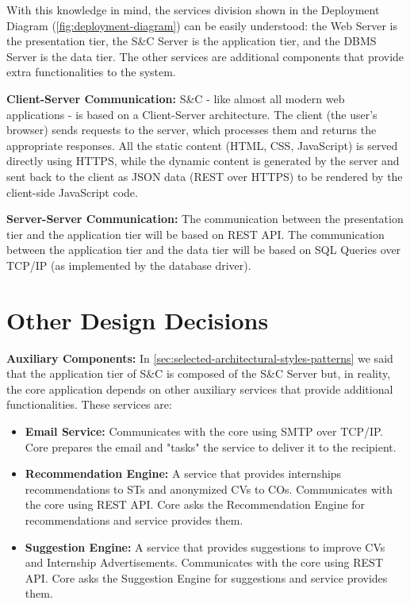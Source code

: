 With this knowledge in mind, the services division shown in the Deployment Diagram (\ref{fig:deployment-diagram}) can
be easily understood: the Web Server is the presentation tier, the S\&C Server is the application tier, and the DBMS
Server is the data tier. The other services are additional components that provide extra functionalities to the system.

\par{\textbf{Client-Server Communication:}} S\&C - like almost all modern web applications - is based on a
Client-Server architecture. The client (the user's browser) sends requests to the server, which processes them and
returns the appropriate responses. All the static content (HTML, CSS, JavaScript) is served directly using HTTPS, while
the dynamic content is generated by the server and sent back to the client as JSON data (REST over HTTPS) to be
rendered by the client-side JavaScript code.

\par{\textbf{Server-Server Communication:}} The communication between the presentation tier and the application tier
will be based on REST API. The communication between the application tier and the data tier will be based on SQL
Queries over TCP/IP (as implemented by the database driver).

\section{Other Design Decisions}
\label{sec:other-design-decisions}%

\par{\textbf{Auxiliary Components:}} In \ref{sec:selected-architectural-styles-patterns} we said that the application
tier of S\&C is composed of the S\&C Server but, in reality, the core application depends on other auxiliary services
that provide additional functionalities. These services are:

\begin{itemize}
      \item \textbf{Email Service:} Communicates with the core using SMTP over TCP/IP. Core prepares the email and
            "tasks" the service to deliver it to the recipient.
      \item \textbf{Recommendation Engine:} A service that provides internships recommendations to STs and anonymized
            CVs to COs. Communicates with the core using REST API. Core asks the Recommendation Engine for
            recommendations and service provides them.
      \item \textbf{Suggestion Engine:} A service that provides suggestions to improve CVs and Internship
            Advertisements. Communicates with the core using REST API. Core asks the Suggestion Engine for suggestions
            and service provides them.
\end{itemize}

